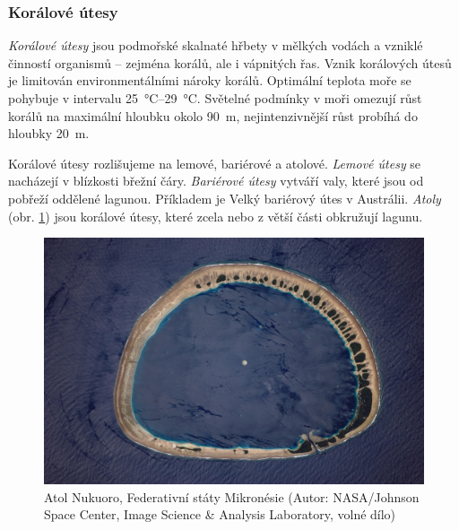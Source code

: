 %
%

\subsubsection{Korálové útesy}
\emph{Korálové útesy} jsou podmořské skalnaté hřbety v mělkých vodách a vzniklé činností organismů -- zejména korálů, ale i vápnitých řas. Vznik korálových útesů je limitován environmentálními nároky korálů. Optimální teplota moře se pohybuje v intervalu \SIrange{25}{29}{\celsius}. Světelné podmínky v moři omezují růst korálů na maximální hloubku okolo \SI{90}{\metre}, nejintenzivnější růst probíhá do hloubky \SI{20}{\metre}. 

Korálové útesy rozlišujeme na lemové, bariérové a atolové. \emph{Lemové útesy} se nacházejí v blízkosti břežní čáry. \emph{Bariérové útesy} vytváří valy, které jsou od pobřeží oddělené lagunou. Příkladem je Velký bariérový útes v Austrálii. \emph{Atoly} (obr. \ref{fig:atol}) jsou korálové útesy, které zcela nebo z větší části obkružují lagunu.

\begin{figure}[h]
	\centering
	\includegraphics[width=1\linewidth]{obrazky/marine/atol}
	\caption{Atol Nukuoro, Federativní státy Mikronésie (Autor: NASA/Johnson Space Center, Image Science \& Analysis Laboratory, volné dílo)}
	\label{fig:atol}
\end{figure}

